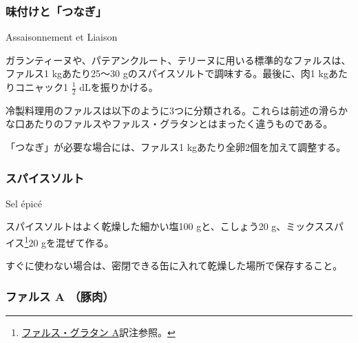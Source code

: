 \begin{recette}

\hypertarget{assaisonnement-et-liaison}{%
\subsubsection{味付けと「つなぎ」}\label{assaisonnement-et-liaison}}

\begin{frsubenv}

Assaisonnement et Liaison

\end{frsubenv}

ガランティーヌや、パテアンクルート、テリーヌに用いる標準的なファルスは、ファルス1
kgあたり25〜30 gのスパイスソルトで調味する。最後に、肉1
kgあたりコニャック1 \(\frac{1}{2}\) dLを振りかける。

\vspace*{.5\zw}

冷製料理用のファルスは以下のように3つに分類される。これらは前述の滑らかな口あたりのファルスやファルス・グラタンとはまったく違うものである。

「つなぎ」が必要な場合には、ファルス1 kgあたり全卵2個を加えて調整する。

\atoaki{}

\hypertarget{sel-epice}{%
\subsubsection{スパイスソルト}\label{sel-epice}}

\begin{frsubenv}

Sel épicé

\end{frsubenv}

 

スパイスソルトはよく乾燥した細かい塩100 gと、こしょう20
g、ミックススパイス\footnote{\protect\hyperlink{farce-gratin-a}{ファルス・グラタン
  A}訳注参照。}20 gを混ぜて作る。

すぐに使わない場合は、密閉できる缶に入れて乾燥した場所で保存すること。

\atoaki{}

\hypertarget{farce-froide-a}{%
\subsubsection{ファルス A （豚肉）}\label{farce-froide-a}}


\end{recette}
